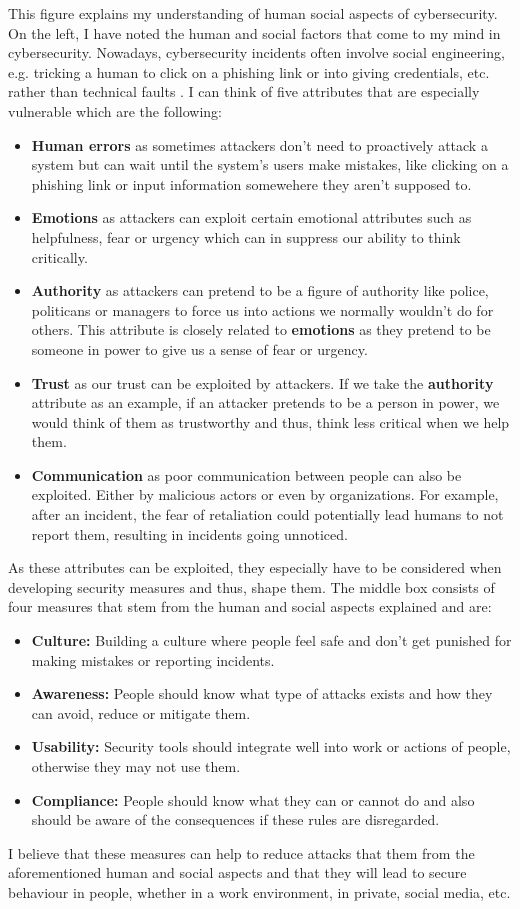\documentclass[12pt]{article}
\begin{document}
This figure explains my understanding of human social aspects of cybersecurity. On the left, I have noted the human and social factors that come to my mind in cybersecurity. Nowadays, cybersecurity incidents often involve social engineering, e.g. tricking a human to click on a phishing link or into giving credentials, etc. rather than technical faults \cite{siddiqi2022study}. I can think of five attributes that are especially vulnerable which are the following:
\begin{itemize}
\item \textbf{Human errors} as sometimes attackers don’t need to proactively attack a system but can wait until the system's users make mistakes, like clicking on a phishing link or input information somewehere they aren't supposed to. 
\item \textbf{Emotions} as attackers can exploit certain emotional attributes such as helpfulness, fear or urgency which can in suppress our ability to think critically.
\item \textbf{Authority} as attackers can pretend to be a figure of authority like police, politicans or managers to force us into actions we normally wouldn't do for others. This attribute is closely related to \textbf{emotions} as they pretend to be someone in power to give us a sense of fear or urgency.
\item \textbf{Trust} as our trust can be exploited by attackers. If we take the \textbf{authority} attribute as an example, if an attacker pretends to be a person in power, we would think of them as trustworthy and thus, think less critical when we help them.
\item \textbf{Communication} as poor communication between people can also be exploited. Either by malicious actors or even by organizations. For example, after an incident, the fear of retaliation could potentially lead humans to not report them, resulting in incidents going unnoticed.
\end{itemize}
As these attributes can be exploited, they especially have to be considered when developing security measures and thus, shape them. The middle box consists of four measures that stem from the human and social aspects explained and are:
\begin{itemize}
\item \textbf{Culture:} Building a culture where people feel safe and don't get punished for making mistakes or reporting incidents.
\item \textbf{Awareness:} People should know what type of attacks exists and how they can avoid, reduce or mitigate them.
\item \textbf{Usability:} Security tools should integrate well into work or actions of people, otherwise they may not use them.
\item \textbf{Compliance:} People should know what they can or cannot do and also should be aware of the consequences if these rules are disregarded. 
\end{itemize}
I believe that these measures can help to reduce attacks that them from the aforementioned human and social aspects and that they will lead to secure behaviour in people, whether in a work environment, in private, social media, etc. 
\end{document}
